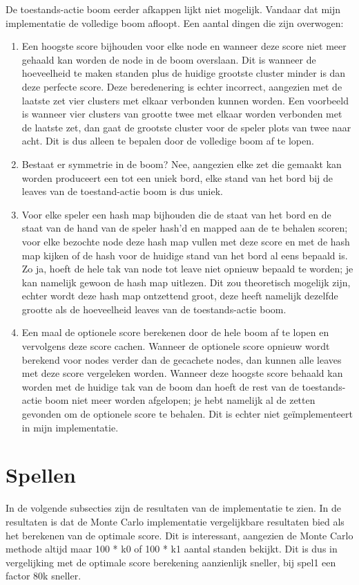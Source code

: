 \documentclass[10pt]{article}
\begin{document}
De toestands-actie boom eerder afkappen lijkt niet mogelijk.
Vandaar dat mijn implementatie de volledige boom afloopt.
Een aantal dingen die zijn overwogen:
\begin{enumerate}
    \item Een hoogste score bijhouden voor elke node en wanneer deze score niet meer gehaald kan worden de node in de boom overslaan. Dit is wanneer de hoeveelheid te maken standen plus de huidige grootste cluster minder is dan deze perfecte score. Deze beredenering is echter incorrect, aangezien met de laatste zet vier clusters met elkaar verbonden kunnen worden. Een voorbeeld is wanneer vier clusters van grootte twee met elkaar worden verbonden met de laatste zet, dan gaat de grootste cluster voor de speler plots van twee naar acht. Dit is dus alleen te bepalen door de volledige boom af te lopen.
    \item Bestaat er symmetrie in de boom? Nee, aangezien elke zet die gemaakt kan worden produceert een tot een uniek bord, elke stand van het bord bij de leaves van de toestand-actie boom is dus uniek. 
    \item Voor elke speler een hash map bijhouden die de staat van het bord en de staat van de hand van de speler hash'd en mapped aan de te behalen scoren; voor elke bezochte node deze hash map vullen met deze score en met de hash map kijken of de hash voor de huidige stand van het bord al eens bepaald is. Zo ja, hoeft de hele tak van node tot leave niet opnieuw bepaald te worden; je kan namelijk gewoon de hash map uitlezen. Dit zou theoretisch mogelijk zijn, echter wordt deze hash map ontzettend groot, deze heeft namelijk dezelfde grootte als de hoeveelheid leaves van de toestands-actie boom.
    \item Een maal de optionele score berekenen door de hele boom af te lopen en vervolgens deze score cachen. Wanneer de optionele score opnieuw wordt berekend voor nodes verder dan de gecachete nodes, dan kunnen alle leaves met deze score vergeleken worden. Wanneer deze hoogste score behaald kan worden met de huidige tak van de boom dan hoeft de rest van de toestands-actie boom niet meer worden afgelopen; je hebt namelijk al de zetten gevonden om de optionele score te behalen. Dit is echter niet ge\"implementeert in mijn implementatie.
\end{enumerate}


\section{Spellen}
In de volgende subsecties zijn de resultaten van de implementatie te zien.
In de resultaten is dat de Monte Carlo implementatie vergelijkbare resultaten bied als het berekenen van de optimale score.
Dit is interessant, aangezien de Monte Carlo methode altijd maar 100 * k0 of 100 * k1 aantal standen bekijkt.
Dit is dus in vergelijking met de optimale score berekening aanzienlijk sneller, bij spel1 een factor 80k sneller.
\end{document}
